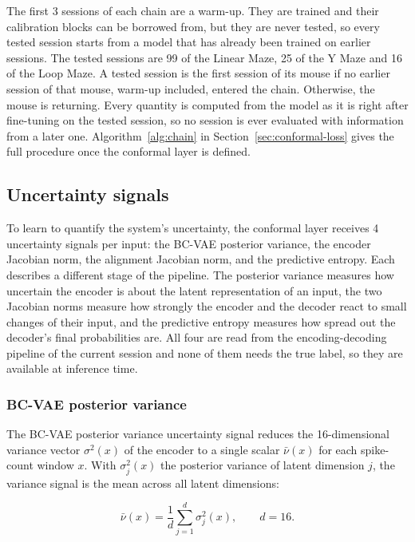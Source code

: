 \documentclass{article}
\begin{document}
The first 3 sessions of each chain are a warm-up. They are trained and their calibration blocks can be borrowed from, but they are never tested, so every tested session starts from a model that has already been trained on earlier sessions. The tested sessions are 99 of the Linear Maze, 25 of the Y Maze and 16 of the Loop Maze. A tested session is the first session of its mouse if no earlier session of that mouse, warm-up included, entered the chain. Otherwise, the mouse is returning. Every quantity is computed from the model as it is right after fine-tuning on the tested session, so no session is ever evaluated with information from a later one. Algorithm~\ref{alg:chain} in Section~\ref{sec:conformal-loss} gives the full procedure once the conformal layer is defined.

\subsection{Uncertainty signals}
\label{sec:uncertainty-signals}
To learn to quantify the system's uncertainty, the conformal layer receives 4 uncertainty signals per input: the BC-VAE posterior variance, the encoder Jacobian norm, the alignment Jacobian norm, and the predictive entropy. Each describes a different stage of the pipeline. The posterior variance measures how uncertain the encoder is about the latent representation of an input, the two Jacobian norms measure how strongly the encoder and the decoder react to small changes of their input, and the predictive entropy measures how spread out the decoder's final probabilities are. All four are read from the encoding-decoding pipeline of the current session and none of them needs the true label, so they are available at inference time.

\subsubsection{BC-VAE posterior variance}
The BC-VAE posterior variance uncertainty signal reduces the 16-dimensional variance vector $\sigma^2(x)$ of the encoder to a single scalar $\bar{\nu}(x)$ for each spike-count window $x$. With $\sigma^2_j(x)$ the posterior variance of latent dimension $j$, the variance signal is the mean across all latent dimensions:

\begin{equation}
  \bar{\nu}(x)=\frac{1}{d}\sum_{j=1}^{d}\sigma_j^2(x), \qquad d=16.
\end{equation}
\end{document}
